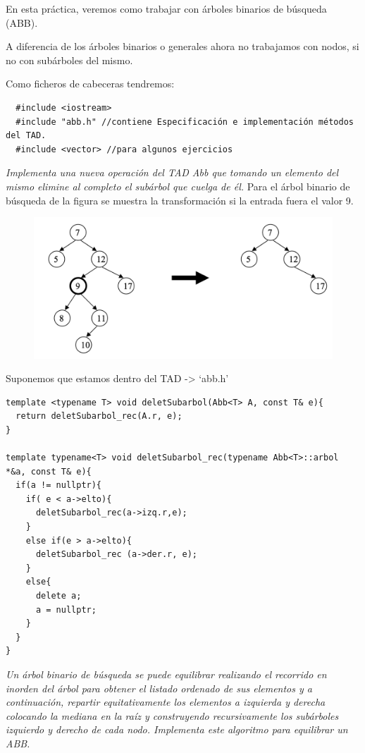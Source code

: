 En esta práctica, veremos como trabajar con árboles binarios de búsqueda (ABB).

A diferencia de los árboles binarios o generales ahora no trabajamos con nodos, si no con subárboles del mismo.

Como ficheros de cabeceras tendremos:
\begin{verbatim}
  #include <iostream>
  #include "abb.h" //contiene Especificación e implementación métodos del TAD.
  #include <vector> //para algunos ejercicios
\end{verbatim}

\textbf{\large{}}\textit{ Implementa una nueva operación del TAD Abb que tomando un elemento del mismo elimine al completo el subárbol que cuelga de él.}
 Para el árbol binario de búsqueda de la figura se muestra la transformación si la entrada fuera el valor 9.
\begin{figure}[h]
  \begin{center}
    \includegraphics*[width=.7\textwidth]{assets/Abb1.png}
  \end{center}
\end{figure}

Suponemos que estamos dentro del TAD -> `abb.h'
\begin{verbatim}
template <typename T> void deletSubarbol(Abb<T> A, const T& e){
  return deletSubarbol_rec(A.r, e);
}

template typename<T> void deletSubarbol_rec(typename Abb<T>::arbol *&a, const T& e){
  if(a != nullptr){
    if( e < a->elto){
      deletSubarbol_rec(a->izq.r,e);
    }
    else if(e > a->elto){
      deletSubarbol_rec (a->der.r, e);
    }
    else{
      delete a;
      a = nullptr;
    }
  }
}
\end{verbatim}
\newpage
\textbf{\large{}}\textit{ Un árbol binario de búsqueda se puede equilibrar realizando el recorrido en inorden del árbol para obtener el listado ordenado de sus elementos y a continuación, repartir equitativamente los elementos a izquierda y derecha colocando la mediana en la raíz y construyendo recursivamente los subárboles izquierdo y derecho de cada nodo. Implementa este algoritmo para equilibrar un ABB.}


